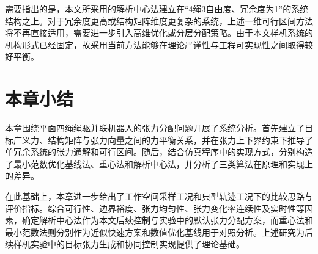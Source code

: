 需要指出的是，本文所采用的解析中心法建立在“4绳3自由度、冗余度为1”的系统结构之上。对于冗余度更高或结构矩阵维度更复杂的系统，上述一维可行区间方法将不再直接适用，需要进一步引入高维优化或分层分配策略。由于本文样机系统的机构形式已经固定，故采用当前方法能够在理论严谨性与工程可实现性之间取得较好平衡。

\section{本章小结}

本章围绕平面四绳绳驱并联机器人的张力分配问题开展了系统分析。首先建立了目标广义力、结构矩阵与张力向量之间的力平衡关系，并在张力上下界约束下推导了单冗余系统的张力通解和可行区间。随后，结合仿真程序中的实现方式，分别构造了最小范数优化基线法、重心法和解析中心法，并分析了三类算法在原理和实现上的差异。

在此基础上，本章进一步给出了工作空间采样工况和典型轨迹工况下的比较思路与评价指标。综合可行性、边界裕度、张力均匀性、张力变化率连续性及实时性等因素，确定解析中心法作为本文后续控制与实验中的默认张力分配方案，而重心法和最小范数法则分别作为近似快速方案和数值优化基线用于对照分析。上述研究为后续样机实验中的目标张力生成和协同控制实现提供了理论基础。
















